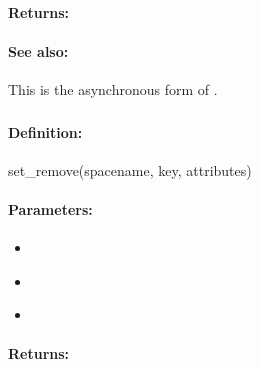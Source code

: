 \paragraph{Returns:}


\paragraph{See also:}  This is the asynchronous form of .

\pagebreak
\subsubsection{}
\label{api:ruby:set_remove}


\paragraph{Definition:}
\begin{rubycode}
set_remove(spacename, key, attributes)
\end{rubycode}

\paragraph{Parameters:}
\begin{itemize}[noitemsep]
\item {}\\

\item {}\\

\item {}\\

\end{itemize}

\paragraph{Returns:}


\pagebreak
\subsubsection{}
\label{api:ruby:async_set_remove}


